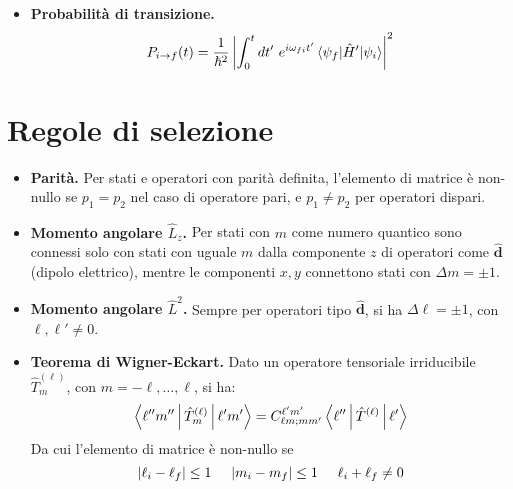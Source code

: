 \documentclass[11pt, a4paper]{scrartcl} %
\numberwithin{equation}{section}
\theoremstyle{style2}
\theoremstyle{style1}
\begin{document}
\begin{multicols}{2}
\begin{itemize}
			Si pu\`o scrivere come:
			\begin{equation}
				d\omega_{kk'} = \frac{4 \pi m }{\hbar } \left\lvert \braket{f|V|i}  \right\rvert ^2 \delta (p^2-p'^2) \frac{d^3 p'}{(2\pi \hbar )^3}
			\end{equation}
			con
			\begin{equation}
				\braket{f|V|i} = \sqrt{\frac{m}{k}} \int e^{i \mathbf{k} ' \cdot \mathbf{x} } V e^{i \mathbf{k} \cdot \mathbf{x} } d^3 x
			\end{equation}
			\item {\sffamily \bfseries Probabilit\`a di transizione.} 
				\begin{equation}
					P_{i\to f} (t) = \frac{1}{\hbar^2 }\left\lvert \int_{0} ^t dt' \ e^{i\omega_{fi} t'} \braket{\psi _f|\hat{H}'|\psi _i}  \right\rvert ^2
				\end{equation}
	\end{itemize}
\end{multicols}
\section{Regole di selezione}
\begin{multicols}{2}
	\begin{itemize}
		\item {\sffamily \bfseries Parit\`a.} Per stati e operatori con parit\`a definita, l'elemento di matrice \`e non-nullo se $p_{1} = p_2$ nel caso di operatore pari, e $p_1 \neq p_2$ per operatori dispari.
			\item {\sffamily \bfseries Momento angolare $\hat{L}_z$.} Per stati con $m$ come numero quantico sono connessi solo con stati con uguale $m$ dalla componente $z$ di operatori come $\hat{\mathbf{d} }$ (dipolo elettrico), mentre le componenti $x,y$ connettono stati con $\Delta m = \pm 1$. 
			\item {\sffamily \bfseries Momento angolare $\hat{L}^2$.} Sempre per operatori tipo $\hat{\mathbf{d} }$, si ha $\Delta \ell = \pm 1$, con $\ell , \ell ' \neq 0$.
				\item {\sffamily \bfseries Teorema di Wigner-Eckart.} Dato un operatore tensoriale irriducibile $\hat{T}^{(\ell )} _m$, con $m=- \ell ,\ldots,\ell $, si ha:
					\begin{equation}
						\Braket{\ell '' m''|\hat{T}^{(\ell )} _m|\ell 'm'} = C^{\ell ' m'} _{\ell m;mm'} \Braket{\ell ''|\hat{T}^{(\ell )} |\ell '} 
					\end{equation}
					Da cui l'elemento di matrice \`e non-nullo se 
					\begin{equation}
						\lvert \ell _i - \ell _f \rvert \le 1 \hspace{.5cm} \lvert m_i - m_f \rvert \le 1 \hspace{.5cm} \ell _i + \ell _f \neq 0 
					\end{equation}
	\end{itemize}
\end{multicols}
\newpage
\end{document}
